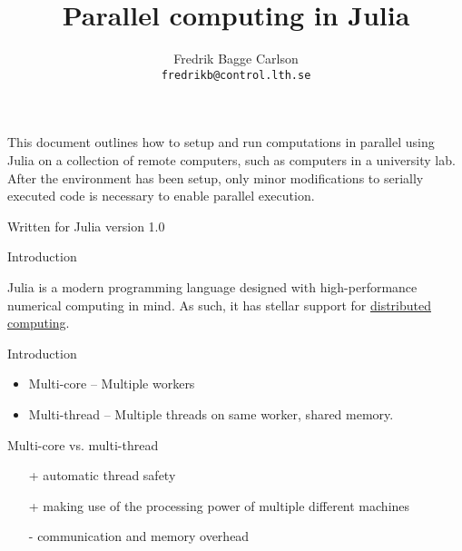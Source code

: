 \documentclass{beamer}
\begin{document}
\newlength\figureheight
\newlength\figurewidth
\setlength{\figurewidth}{0.4\textwidth}
\setlength{\figureheight }{4cm }

\title{Parallel computing in Julia}
\author{Fredrik Bagge Carlson\\ \texttt{fredrikb@control.lth.se}}

\maketitle
\begin{frame}{}{}

	This document outlines how to setup and run computations in parallel using Julia on a collection of remote computers, such as computers in a university lab. After the environment has been setup, only minor modifications to serially executed code is necessary to enable parallel execution.

	Written for Julia version 1.0

\end{frame}

\begin{frame}{Introduction}

	Julia is a modern programming language designed with high-performance numerical computing in mind. As such, it has stellar support for \href{https://docs.julialang.org/en/v1/manual/parallel-computing/}{distributed computing}.
\end{frame}


\begin{frame}{Introduction}{}
	\begin{itemize}
		\item Multi-core -- Multiple workers
		\item Multi-thread -- Multiple threads on same worker, shared memory.
	\end{itemize}

	Multi-core vs. multi-thread
	\begin{itemize}
		\item[+] automatic thread safety
		\item[+] making use of the processing power of multiple different machines
		\item[-] communication and memory overhead
	\end{itemize}
\end{frame}
\end{document}
